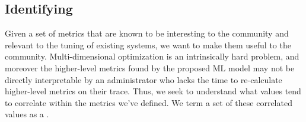 
\subsection{Identifying \MWs}

Given a set of metrics that are known to be interesting to the community and
relevant to the tuning of existing systems, we want to make them useful to the
community.  Multi-dimensional optimization is an intrinsically hard problem, and
moreover the higher-level metrics found by the proposed ML model may not be directly interpretable by an administrator who lacks the time to re-calculate
higher-level metrics on their trace.  Thus, we seek to understand what values
tend to correlate within the metrics we've defined.  We term a set of these
correlated values as a \mW.

 


